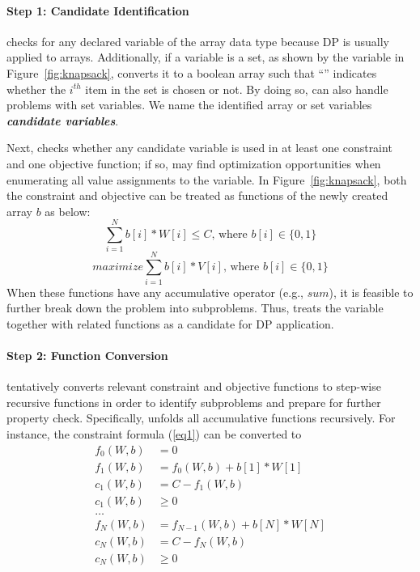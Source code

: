 \paragraph*{Step 1: Candidate Identification}
\tool checks for any declared variable of the array data type because DP is usually applied to arrays. Additionally, if a variable is a set, as shown by the  variable in Figure~\ref{fig:knapsack}, \tool converts it to a boolean array  such that ``'' indicates whether the $i^{th}$ item in the set is chosen or not. 
By doing so, \tool can also handle problems with set variables. We name the identified array or set variables \textbf{\emph{candidate variables}}. 
 
Next, \tool checks 
whether any candidate variable is used in at least one constraint and one objective function; if so, \tool may find optimization opportunities when enumerating all value assignments to the variable. 
In Figure~\ref{fig:knapsack}, both the constraint and objective can be treated as functions of the newly created array $b$ as below: 
\begin{equation}
\label{eq1}
   \sum_{i=1}^{N}b[i]*W[i] \le C \text{, where }b[i]\in\{0, 1\}  \tag{3.1}
\end{equation}
\begin{equation}
\label{eq2}
    maximize \sum_{i=1}^{N}b[i]*V[i] \text{, where }b[i]\in\{0, 1\}  \tag{3.2}
\end{equation}
When these functions have any accumulative operator (e.g., $sum$), it is feasible to further break down the problem into subproblems.
Thus, \tool treats the variable  together with related functions as a candidate for DP application.

\paragraph{Step 2: Function Conversion}
\tool tentatively converts relevant constraint and objective functions to step-wise recursive functions in order to identify subproblems and prepare for further property check. 
Specifically, 
\tool unfolds all accumulative functions 
recursively. 
For instance, the constraint formula (\ref{eq1}) can be converted to
\begin{align}
\label{fun1}
f_0(W, b)&=0 \nonumber\\
f_1(W, b)&=f_0(W, b) + b[1] * W[1] \nonumber\\
c_1(W, b)&=C-f_1(W, b)\nonumber\\
c_1(W, b)&\ge 0 \nonumber\\
\ldots \tag{3.3}\\  
f_N(W, b)&=f_{N-1}(W, b) + b[N] * W[N] \nonumber\\
c_N(W, b)&=C-f_N(W, b) \nonumber\\
c_N(W, b)& \ge 0 \nonumber
\end{align}

